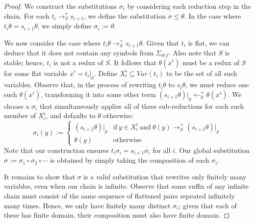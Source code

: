 \documentclass{article}
\theoremstyle{definition}
\begin{document}
\begin{proof}
    We construct the substitutions $\sigma_i$ by considering each reduction step in the chain. For each $t_i \rightarrow^*_S s_{i+1}$, we define the substitution $\sigma \leq \theta$.  In the case where $t_i\theta = s_{i+1}\theta$, we simply define $\sigma_i := \theta$. 
    
    We now consider the case where $t_i \theta \rightarrow^+_S s_{i+1} \theta$. Given that $t_i$ is flat, we can deduce that it does not contain any symbols from $\Sigma_{def}$. Also note that $S$ is stable; hence, $t_i$ is not a redux of $S$. It follows that $\theta(x^\flat)$ must be a redux of $S$ for some flat variable $x^\flat = t_i |_p$. Define $X_i^\flat \subseteq Var(t_i)$ to be the set of all such variables. Observe that, in the process of rewriting $t_i\theta$ to $s_i\theta$, we must reduce one such $\theta(x^\flat)$, transforming it into some other term $(s_{i+1} \theta)|_p \leftarrow^+_S \theta(x^\flat)$. We choose a $\sigma_i$ that simultaneously applies all of these sub-reductions for each such member of $X_i^\flat$, and defaults to $\theta$ otherwise: 
    $$\sigma_i(y) := \begin{cases}
        (s_{i+1} \theta)|_p  &\text{if}~ y \in X_i^\flat ~\text{and}~ \theta(y) \rightarrow^+_S (s_{i+1}\theta)|_p \\
        \theta(y) &\text{otherwise}
    \end{cases}$$
    Note that our construction ensures $t_i\sigma_i = s_{i+1}\sigma_i$ for all $i$. Our global substitution $\sigma := \sigma_1 \circ \sigma_2 \circ \cdots$ is obtained by simply taking the composition of each $\sigma_i$. 
    
    It remains to show that $\sigma$ is a valid substitution that rewrites only finitely many variables, even when our chain is infinite. Observe that some suffix of any infinite chain must consist of the same sequence of flattened pairs repeated infinitely many times. Hence, we only have finitely many distinct $\sigma_i$; given that each of these has finite domain, their composition must also have finite domain. 
\end{proof}
\end{document}

